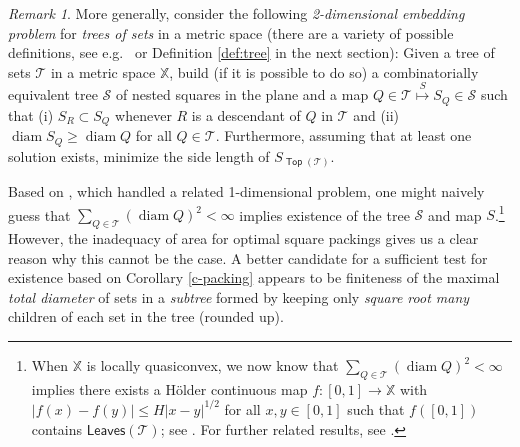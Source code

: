 \documentclass[12pt]{amsart}
\theoremstyle{definition}
\theoremstyle{remark}
\newtheorem{remark}[theorem]{Remark}
\newcommand{\XX}{\mathbb{X}}
\newcommand{\diam}{\mathop\mathrm{diam}\nolimits}
\newcommand{\leaves}{\mathsf{Leaves}}
\newcommand{\Top}{\mathop\mathsf{Top}}
\numberwithin{figure}{section}
\numberwithin{equation}{section}
\begin{document}
\begin{remark}\label{r:tree-square} More generally, consider the following \emph{2-dimensional embedding problem} for \emph{trees of sets} in a metric space (there are a variety of possible definitions, see e.g.~\cite[\S2]{BV} or Definition \ref{def:tree} in the next section):
Given a tree of sets $\mathcal{T}$ in a metric space $\XX$, build (if it is possible to do so) a combinatorially equivalent tree $\mathcal{S}$ of nested squares in the plane and a map $Q\in\mathcal{T} \overset{S}{\mapsto} S_Q\in\mathcal{S}$ such that (i) $S_{R}\subset S_{Q}$ whenever $R$ is a descendant of $Q$ in $\mathcal{T}$ and (ii) $\diam S_Q\geq \diam Q$ for all $Q\in\mathcal{T}$. Furthermore, assuming that at least one solution exists, minimize the side length of $S_{\Top(\mathcal{T})}$.

Based on \cite[\S3]{BS2}, which handled  a related 1-dimensional problem, one might naively guess that $\sum_{Q\in\mathcal{T}}(\diam Q)^2<\infty$ implies existence of the tree $\mathcal{S}$ and map $S$.\footnote{When $\XX$ is locally quasiconvex, we now know that $\sum_{Q\in\mathcal{T}}(\diam Q)^2<\infty$ implies there exists a H\"older continuous map $f:[0,1]\rightarrow \XX$ with $|f(x)-f(y)|\leq H|x-y|^{1/2}$ for all $x,y\in[0,1]$ such that $f([0,1])$ contains $\leaves(\mathcal{T})$; see \cite{BV,Balogh-Zust}. For further related results, see \cite{AS-TST,BNV,Hyde-TST}.} However, the inadequacy of area for optimal square packings gives us a clear reason why this cannot be the case. A better candidate for a sufficient test for existence based on Corollary \ref{c-packing} appears to be finiteness of the maximal \emph{total diameter} of sets in a \emph{subtree} formed by keeping only \emph{square root many} children of each set in the tree (rounded up). %


\end{remark}
\end{document}
